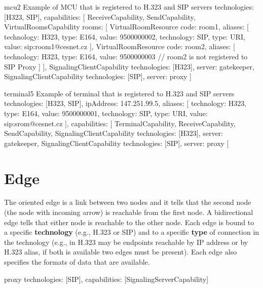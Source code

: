 \begin{itemize}
\begin{EntityExample}{}{mcu2}%
      {Example of MCU that is registered to H.323 and SIP servers}
technologies: [H323, SIP],
capabilities: [
  ReceiveCapability,
  SendCapability,
  VirtualRoomsCapability {rooms: [
    VirtualRoomResource {code: room1, aliases: [
      {technology: H323, type: E164, value: 9500000002},
      {technology: SIP, type: URI, value: sip:room1@cesnet.cz}
    ]}, 
    VirtualRoomResource {code: room2, aliases: [
      {technology: H323, type: E164, value: 9500000003}
      // room2 is not registered to SIP Proxy
    ]}
  ]},
  SignalingClientCapability {technologies: [H323], server: gatekeeper},  
  SignalingClientCapability {technologies: [SIP], server: proxy}
]
\end{EntityExample}

\begin{EntityExample}{}{terminal5}%
      {Example of terminal that is registered to H.323 and SIP servers}
technologies: [H323, SIP],
ipAddress: 147.251.99.5,
aliases: [
  {technology: H323, type: E164, value: 9500000001},
  {technology: SIP, type: URI, value: sip:srom@cesnet.cz}
],
capabilities: [
  TerminalCapability,
  ReceiveCapability,
  SendCapability,
  SignalingClientCapability {technologies: [H323], server: gatekeeper},
  SignalingClientCapability {technologies: [SIP], server: proxy}
]
\end{EntityExample}

\end{itemize}
 

\section{Edge}

The oriented edge is a link between two nodes and it tells that the second 
node (the node with incoming arrow) is reachable from the first node. A 
bidirectional edge tells that either node is reachable to the other node. 
Each edge is bound to a specific \textbf{technology} (e.g., H.323 or SIP) and 
to a specific \textbf{type} of connection in the technology (e.g., in H.323 
may be endpoints reachable by IP address or by H.323 alias, if both is 
available two edges must be present). Each edge also specifies the formats of data that are available.

\begin{EntityExample}{}{proxy}{}
technologies: [SIP],
capabilities: [SignalingServerCapability]
\end{EntityExample}

